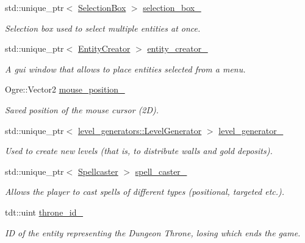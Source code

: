 \begin{DoxyCompactItemize}
std\+::unique\+\_\+ptr$<$ \hyperlink{class_selection_box}{Selection\+Box} $>$ \hyperlink{class_game_af49a6f70e2392c419e0bbc6157b809a4}{selection\+\_\+box\+\_\+}
\begin{DoxyCompactList}\small\item\em Selection box used to select multiple entities at once. \end{DoxyCompactList}\item 
std\+::unique\+\_\+ptr$<$ \hyperlink{class_entity_creator}{Entity\+Creator} $>$ \hyperlink{class_game_ad5a3e4b03b13386ab6dd759017573821}{entity\+\_\+creator\+\_\+}
\begin{DoxyCompactList}\small\item\em A gui window that allows to place entities selected from a menu. \end{DoxyCompactList}\item 
Ogre\+::\+Vector2 \hyperlink{class_game_abd514cad4e3b88d5ab87e8f2e966fd4a}{mouse\+\_\+position\+\_\+}
\begin{DoxyCompactList}\small\item\em Saved position of the mouse cursor (2D). \end{DoxyCompactList}\item 
std\+::unique\+\_\+ptr$<$ \hyperlink{classlevel__generators_1_1_level_generator}{level\+\_\+generators\+::\+Level\+Generator} $>$ \hyperlink{class_game_a180d400b3d9f3781f31822f9141704b2}{level\+\_\+generator\+\_\+}
\begin{DoxyCompactList}\small\item\em Used to create new levels (that is, to distribute walls and gold deposits). \end{DoxyCompactList}\item 
std\+::unique\+\_\+ptr$<$ \hyperlink{class_spellcaster}{Spellcaster} $>$ \hyperlink{class_game_a16f63fa6189119f189b90129558af639}{spell\+\_\+caster\+\_\+}
\begin{DoxyCompactList}\small\item\em Allows the player to cast spells of different types (positional, targeted etc.). \end{DoxyCompactList}\item 
tdt\+::uint \hyperlink{class_game_add2c7263d03befb832ce112ccf09b3eb}{throne\+\_\+id\+\_\+}
\begin{DoxyCompactList}\small\item\em ID of the entity representing the Dungeon Throne, losing which ends the game. \end{DoxyCompactList}\end{DoxyCompactItemize}
